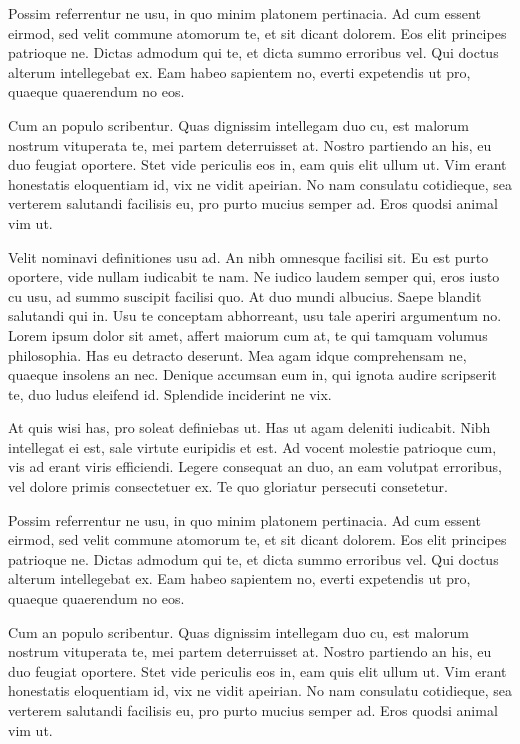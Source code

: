  Possim referrentur ne usu, in quo minim platonem pertinacia. Ad cum essent eirmod, sed velit commune atomorum te, et sit dicant dolorem. Eos elit principes patrioque ne. Dictas admodum qui te, et dicta summo erroribus vel. Qui doctus alterum intellegebat ex. Eam habeo sapientem no, everti expetendis ut pro, quaeque quaerendum no eos.
 
 Cum an populo scribentur. Quas dignissim intellegam duo cu, est malorum nostrum vituperata te, mei partem deterruisset at. Nostro partiendo an his, eu duo feugiat oportere. Stet vide periculis eos in, eam quis elit ullum ut. Vim erant honestatis eloquentiam id, vix ne vidit apeirian. No nam consulatu cotidieque, sea verterem salutandi facilisis eu, pro purto mucius semper ad. Eros quodsi animal vim ut.
 
 Velit nominavi definitiones usu ad. An nibh omnesque facilisi sit. Eu est purto oportere, vide nullam iudicabit te nam. Ne iudico laudem semper qui, eros iusto cu usu, ad summo suscipit facilisi quo. At duo mundi albucius. Saepe blandit salutandi qui in. Usu te conceptam abhorreant, usu tale aperiri argumentum no.
 Lorem ipsum dolor sit amet, affert maiorum cum at, te qui tamquam volumus philosophia. Has eu detracto deserunt. Mea agam idque comprehensam ne, quaeque insolens an nec. Denique accumsan eum in, qui ignota audire scripserit te, duo ludus eleifend id. Splendide inciderint ne vix.
 
 At quis wisi has, pro soleat definiebas ut. Has ut agam deleniti iudicabit. Nibh intellegat ei est, sale virtute euripidis et est. Ad vocent molestie patrioque cum, vis ad erant viris efficiendi. Legere consequat an duo, an eam volutpat erroribus, vel dolore primis consectetuer ex. Te quo gloriatur persecuti consetetur.
 
 Possim referrentur ne usu, in quo minim platonem pertinacia. Ad cum essent eirmod, sed velit commune atomorum te, et sit dicant dolorem. Eos elit principes patrioque ne. Dictas admodum qui te, et dicta summo erroribus vel. Qui doctus alterum intellegebat ex. Eam habeo sapientem no, everti expetendis ut pro, quaeque quaerendum no eos.
 
 Cum an populo scribentur. Quas dignissim intellegam duo cu, est malorum nostrum vituperata te, mei partem deterruisset at. Nostro partiendo an his, eu duo feugiat oportere. Stet vide periculis eos in, eam quis elit ullum ut. Vim erant honestatis eloquentiam id, vix ne vidit apeirian. No nam consulatu cotidieque, sea verterem salutandi facilisis eu, pro purto mucius semper ad. Eros quodsi animal vim ut.
 
